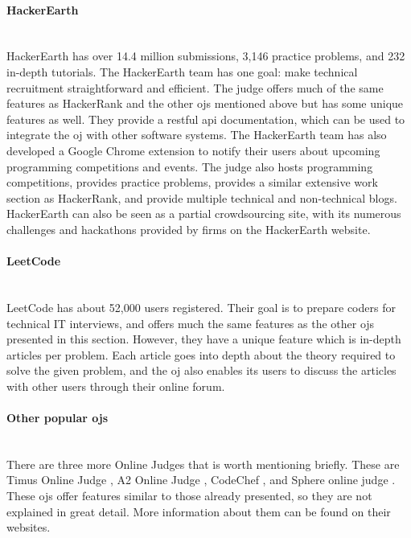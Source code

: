 \paragraph*{HackerEarth} \hfill \\
HackerEarth \cite{HACKEREARTH} has over 14.4 million submissions, 3,146 practice problems, and 232 in-depth tutorials. The HackerEarth team has one goal: make technical recruitment straightforward and efficient. The judge offers much of the same features as HackerRank and the other \glspl{oj} mentioned above but has some unique features as well. They provide a \gls{rest}ful \gls{api} documentation, which can be used to integrate the \gls{oj} with other software systems. The HackerEarth team has also developed a Google Chrome extension to notify their users about upcoming programming competitions and events. The judge also hosts programming competitions, provides practice problems, provides a similar extensive work section as HackerRank, and provide multiple technical and non-technical blogs. HackerEarth can also be seen as a partial crowdsourcing site, with its numerous challenges and hackathons provided by firms on the HackerEarth website.

\paragraph*{LeetCode} \hfill \\
LeetCode \cite{LEETCODE} has about 52,000 users registered. Their goal is to prepare coders for technical IT interviews, and offers much the same features as the other \glspl{oj} presented in this section. However, they have a unique feature which is in-depth articles per problem. Each article goes into depth about the theory required to solve the given problem, and the \gls{oj} also enables its users to discuss the articles with other users through their online forum.

\paragraph*{Other popular \glspl{oj}} \hfill \\
There are three more Online Judges that is worth mentioning briefly. These are Timus Online Judge \cite{TIMUS}, A2 Online Judge \cite{A2OJ}, CodeChef \cite{CODECHEF}, and Sphere online judge \cite{SPHERE}. These \glspl{oj} offer features similar to those already presented, so they are not explained in great detail. More information about them can be found on their websites.

